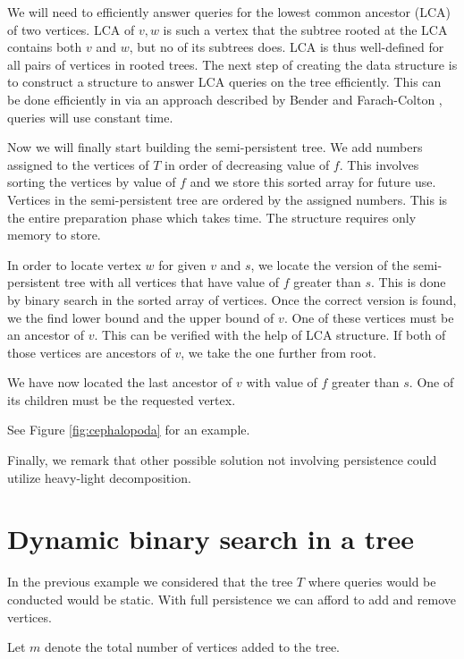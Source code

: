 We will need to efficiently answer queries for the lowest common ancestor (LCA) of two vertices. LCA of $v, w$ is such a vertex that the subtree rooted at the LCA contains both $v$ and $w$, but no of its subtrees does. LCA is thus well-defined for all pairs of vertices in rooted trees. The next step of creating the data structure is to construct a structure to answer LCA queries on the tree efficiently. This can be done efficiently in  via an approach described by Bender and Farach-Colton \cite{lca}, queries will use constant time.

Now we will finally start building the semi-persistent tree. We add numbers assigned to the vertices of $T$ in order of decreasing value of $f$. This involves sorting the vertices by value of $f$ and we store this sorted array for future use. Vertices in the semi-persistent tree are ordered by the assigned numbers. This is the entire preparation phase which takes  time. The structure requires only  memory to store.

In order to locate vertex $w$ for given $v$ and $s$, we locate the version of the semi-persistent tree with all vertices that have value of $f$ greater than $s$. This is done by binary search in the sorted array of vertices. Once the correct version is found, we the find lower bound and the upper bound of $v$. One of these vertices must be an ancestor of $v$. This can be verified with the help of LCA structure. If both of those vertices are ancestors of $v$, we take the one further from root. 

We have now located the last ancestor of $v$ with value of $f$ greater than $s$. One of its children must be the requested vertex.

See Figure \ref{fig:cephalopoda} for an example.

Finally, we remark that other possible solution not involving persistence could utilize heavy-light decomposition.



\section{Dynamic binary search in a tree}

In the previous example we considered that the tree $T$ where queries would be conducted would be static. With full persistence we can afford to add and remove vertices.

Let $m$ denote the total number of vertices added to the tree.

